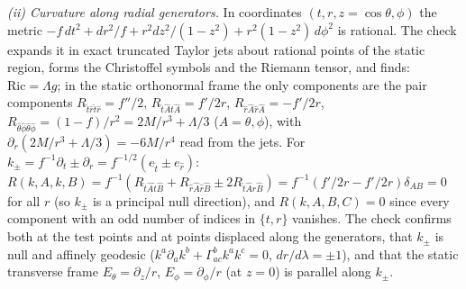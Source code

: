 \emph{(ii) Curvature along radial generators.} In coordinates $(t, r, z = \cos\theta, \phi)$ the metric $-f\,dt^{2} + dr^{2}/f + r^{2}dz^{2}/(1 - z^{2}) + r^{2}(1 - z^{2})\,d\phi^{2}$ is rational. The check expands it in exact truncated Taylor jets about rational points of the static region, forms the Christoffel symbols and the Riemann tensor, and finds: $\mathrm{Ric} = \Lambda g$; in the static orthonormal frame the only components are the pair components $R_{\hat t\hat r\hat t\hat r} = f''/2$, $R_{\hat t\hat A\hat t\hat A} = f'/2r$, $R_{\hat r\hat A\hat r\hat A} = -f'/2r$, $R_{\hat\theta\hat\phi\hat\theta\hat\phi} = (1 - f)/r^{2} = 2M/r^{3} + \Lambda/3$ ($A = \theta, \phi$), with $\partial_{r}(2M/r^{3} + \Lambda/3) = -6M/r^{4}$ read from the jets. For $k_{\pm} = f^{-1}\partial_{t} \pm \partial_{r} = f^{-1/2}(e_{\hat t} \pm e_{\hat r})$: $R(k, A, k, B) = f^{-1}(R_{\hat t\hat A\hat t\hat B} + R_{\hat r\hat A\hat r\hat B} \pm 2R_{\hat t\hat A\hat r\hat B}) = f^{-1}(f'/2r - f'/2r)\delta_{AB} = 0$ for all $r$ (so $k_{\pm}$ is a principal null direction), and $R(k, A, B, C) = 0$ since every component with an odd number of indices in $\{t, r\}$ vanishes. The check confirms both at the test points and at points displaced along the generators, that $k_{\pm}$ is null and affinely geodesic ($k^{a}\partial_{a}k^{b} + \Gamma^{b}_{ac}k^{a}k^{c} = 0$, $dr/d\lambda = \pm 1$), and that the static transverse frame $E_{\theta} = \partial_{z}/r$, $E_{\phi} = \partial_{\phi}/r$ (at $z = 0$) is parallel along $k_{\pm}$.

